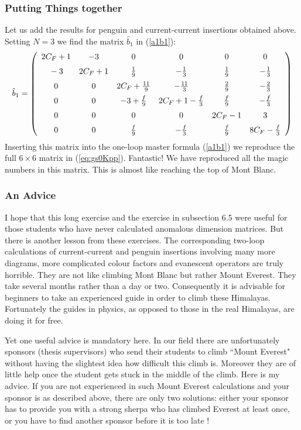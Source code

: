 \documentclass[12pt]{article}
\newcommand{\svs}{\vbox{\vskip 5mm}}
\begin{document}
\begin{itemize}
\begin{itemize}
\subsubsection{Putting Things together}
Let us add the results for penguin and current-current insertions 
obtained above. Setting $N=3$ we find the matrix $\hat b_1$ in
(\ref{a1b1}):
\begin{equation} 
\hat b_1 =  
\left( 
\begin{array}{cccccc} 
2 C_F +1 & -3 & 0 & 0 & 0 & 0 \\ \svs 
 -3 & 2C_F +1 & {{1}\over {9}} & -{1\over 3} & {{1}\over {9}} & 
  -{1\over 3} \\ \svs 
0 & 0 &  2C_F+\frac{11}{9} & -{{11}\over 3} & {{2}\over {9}}  
& -{2\over 3} \\ \svs 
0 & 0 & {-3 +{f\over 9}} & 2C_F+1 -\frac{f}{3}  
& {{f}\over {9}} & -{{f}\over 3} \\ \svs 
0 & 0 & 0 & 0 & 2C_F-1 & 3  \\ \svs 
0 & 0 & {{f}\over {9}} & -{{f}\over 3} & {{f}\over {9}} &  
8C_F - \frac{f}{3} 
\end{array} 
\right) 
\label{bhat} 
\end{equation}
Inserting this matrix into the one-loop master formula (\ref{a1b1}) 
we reproduce
the full $6\times 6$ matrix in (\ref{eq:gs0Kpp}). 
Fantastic! We have reproduced all the magic numbers 
in this matrix. This is almost like reaching the top of
Mont Blanc.

\subsubsection{An Advice}
I hope that this long exercise and the exercise in subsection 6.5 were
useful for those students who have never calculated anomalous dimension
matrices.
But there is another lesson from these exercises. The corresponding
two-loop calculations of current-current and penguin insertions 
involving many more diagrams, more complicated colour factors and
evanescent operators are truly horrible. They are not like climbing
Mont Blanc but rather Mount Everest. They take several months rather
than a day or two. Consequently it is advisable for beginners to
take an experienced guide in order to climb these Himalayas.
Fortunately the guides in physics, as opposed to those in the real
Himalayas, are doing it for free. 

Yet one useful advice
is mandatory here. In our field there are unfortunately sponsors
(thesis supervisors) who send  their students to climb ``Mount Everest"
without having the slightest idea how difficult this climb is. Moreover
they are of little help once the student gets stuck in the middle of the
climb. Here is my advice. If you are not experienced in such Mount
Everest calculations and your sponsor is as described above, there
are only two solutions: either your sponsor has to provide you with
a strong sherpa who has climbed  Everest at least once, or you have 
to find another sponsor before it is too late \cite{Krakauer}!


\end{itemize}
\end{itemize}
\end{document}
